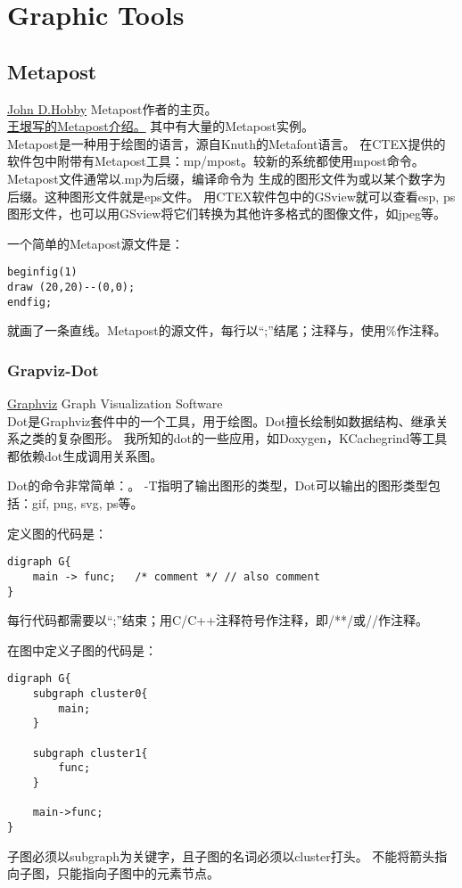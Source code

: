 \part{Graphic Tools}

\chapter{Metapost}
\noindent\href{http://ect.bell-labs.com/who/hobby/index.shtml}{John D.Hobby} Metapost作者的主页。\\
\noindent\href{http://docs.huihoo.com/homepage/shredderyin/metapost.html}{王垠写的Metapost介绍。} 其中有大量的Metapost实例。\\

Metapost是一种用于绘图的语言，源自Knuth的Metafont语言。
在CTEX提供的软件包中附带有Metapost工具：mp/mpost。较新的系统都使用mpost命令。
Metapost文件通常以.mp为后缀，编译命令为
生成的图形文件为或以某个数字为后缀。这种图形文件就是eps文件。
用CTEX软件包中的GSview就可以查看esp, ps图形文件，也可以用GSview将它们转换为其他许多格式的图像文件，如jpeg等。

一个简单的Metapost源文件是：
\begin{lstlisting}
beginfig(1)
draw (20,20)--(0,0);
endfig;
\end{lstlisting}
就画了一条直线。Metapost的源文件，每行以``;''结尾；注释与，使用\%作注释。

\section{Grapviz-Dot}
\noindent\href{http://www.graphviz.org/}{Graphviz} Graph Visualization Software\\

Dot是Graphviz套件中的一个工具，用于绘图。Dot擅长绘制如数据结构、继承关系之类的复杂图形。
我所知的dot的一些应用，如Doxygen，KCachegrind等工具都依赖dot生成调用关系图。

Dot的命令非常简单：。
-T指明了输出图形的类型，Dot可以输出的图形类型包括：gif, png, svg, ps等。

定义图的代码是：
\begin{verbatim}
digraph G{
    main -> func;   /* comment */ // also comment
}
\end{verbatim}
每行代码都需要以``;''结束；用C/C++注释符号作注释，即/**/或//作注释。

在图中定义子图的代码是：
\begin{verbatim}
digraph G{
    subgraph cluster0{
        main;
    }

    subgraph cluster1{
        func;
    }

    main->func;
}
\end{verbatim}
子图必须以subgraph为关键字，且子图的名词必须以cluster打头。
不能将箭头指向子图，只能指向子图中的元素节点。
